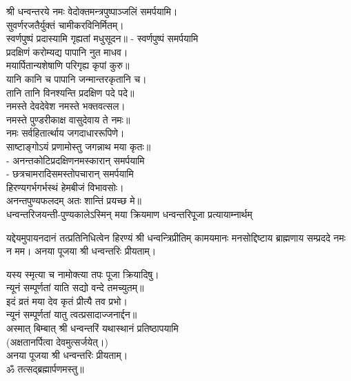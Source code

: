 श्री धन्वन्तरये नमः वेदोक्तमन्त्रपुष्पाञ्जलिं समर्पयामि।\\

सुवर्णरजतैर्युक्तं चामीकरविनिर्मितम्।\\
स्वर्णपुष्पं प्रदास्यामि गृह्यतां मधुसूदन॥ - स्वर्णपुष्पं समर्पयामि\\
 
प्रदक्षिणं करोम्यद्य पापानि नुत माधव।\\
मयार्पितान्यशेषाणि परिगृह्य कृपां कुरु॥\\
 यानि कानि च पापानि जन्मान्तरकृतानि च।\\
तानि तानि विनश्यन्ति प्रदक्षिण पदे पदे॥\\
 
नमस्ते देवदेवेश नमस्ते भक्तवत्सल।\\
नमस्ते पुण्डरीकाक्ष वासुदेवाय ते नमः॥\\
नमः सर्वहितार्त्थाय जगदाधाररूपिणे।\\
साष्टाङ्गोऽयं प्रणामोस्तु जगन्नाथ मया कृतः॥\\
- अनन्तकोटिप्रदक्षिणनमस्कारान् समर्पयामि\\
 - छत्रचामरादिसमस्तोपचारान् समर्पयामि\\

हिरण्यगर्भगर्भस्थं हेमबीजं विभावसोः।\\
अनन्तपुण्यफलदम् अतः शान्तिं प्रयच्छ मे॥\\

धन्वन्तरिजयन्ती-पुण्यकालेऽस्मिन् मया क्रियमाण धन्वन्तरिपूजा प्रत्यायाम्नार्थम्

यद्देयमुपायनदानं तत्प्रतिनिधित्वेन हिरण्यं श्री धन्वन्त्रिप्रीतिम् 
कामयमानः मनसोद्दिष्टाय ब्राह्मणाय सम्प्रददे नमः न मम। 
अनया पूजया श्री धन्वन्तरिः प्रीयताम्। 
 
 यस्य स्मृत्या च नामोक्त्या तपः पूजा क्रियादिषु।\\
न्यूनं सम्पूर्णतां याति सद्यो वन्दे तमच्युतम्॥ \\
इदं व्रतं मया देव कृतं प्रीत्यै तव प्रभो।\\
न्यूनं सम्पूर्णतां यातु त्वत्प्रसादाज्जनार्द्दन॥\\
 
अस्मात् बिम्बात् श्री धन्वन्तरिं यथास्थानं प्रतिष्ठापयामि\\
(अक्षतानर्पित्वा देवमुत्सर्जयेत्।)\\
अनया पूजया श्री धन्वन्तरिः प्रीयताम्। \\
ॐ तत्सद्ब्रह्मार्पणमस्तु॥